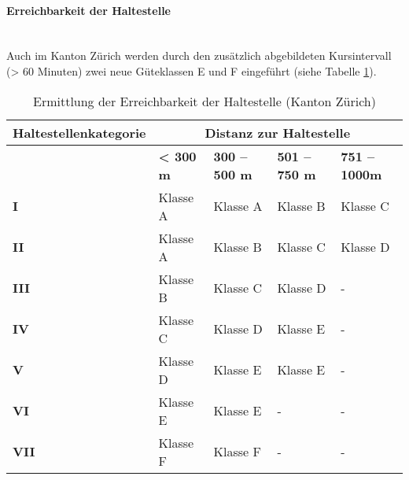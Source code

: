 \paragraph{Erreichbarkeit der Haltestelle}~\\
\label{Berechnungsmethodik Kanton Zürich:Erreichbarkeit der Haltestelle}
Auch im Kanton Zürich werden durch den zusätzlich abgebildeten Kursintervall (> 60 Minuten) zwei neue Güteklassen E und F eingeführt (siehe Tabelle \ref{table:Ermittlung Erreichbarkeit der Haltestelle (Kanton Zürich)}).

\begin{table}[ht]
    \begin{tabular}[c]{l p{2.5cm} p{2.5cm} p{2.5cm} p{2.5cm}}
        \toprule
        \textbf{Haltestellenkategorie}
                                & \multicolumn{4}{c}{\textbf{Distanz zur Haltestelle}}\\
        \midrule
        \textbf{}
                                & \textbf{< 300 m}
                                & \textbf{300 -- 500 m}
                                & \textbf{501 -- 750 m}
                                & \textbf{751 -- 1000m}\\
        \textbf{I}
                                & Klasse A
                                & Klasse A
                                & Klasse B
                                & Klasse C\\
        \textbf{II}
                                & Klasse A
                                & Klasse B
                                & Klasse C
                                & Klasse D\\
        \textbf{III}
                                & Klasse B
                                & Klasse C
                                & Klasse D
                                & -\\
        \textbf{IV}
                                & Klasse C
                                & Klasse D
                                & \cellcolor{red!25}Klasse E
                                & -\\
        \textbf{V}
                                & Klasse D
                                & \cellcolor{red!25}Klasse E
                                & \cellcolor{red!25}Klasse E
                                & -\\
        \cellcolor{red!25}\textbf{VI}
                                & \cellcolor{red!25}Klasse E
                                & \cellcolor{red!25}Klasse E
                                & -
                                & -\\
        \cellcolor{red!25}\textbf{VII}
                                & \cellcolor{red!25}Klasse F
                                & \cellcolor{red!25}Klasse F
                                & -
                                & -\\                                
        \bottomrule
    \end{tabular}
    \caption{Ermittlung der Erreichbarkeit der Haltestelle (Kanton Zürich)}
    \label{table:Ermittlung Erreichbarkeit der Haltestelle (Kanton Zürich)}
\end{table}

